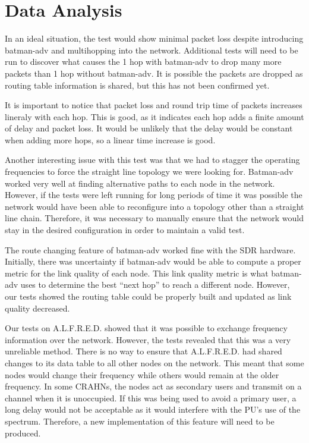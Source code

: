 
\section{Data Analysis}

In an ideal situation, the test would show minimal packet loss despite introducing batman-adv and multihopping into the network. Additional tests will need to be run to discover what causes the 1 hop with batman-adv to drop many more packets than 1 hop without batman-adv. It is possible the packets are dropped as routing table information is shared, but this has not been confirmed yet. 

It is important to notice that packet loss and round trip time of packets increases lineraly with each hop. This is good, as it indicates each hop adds a finite amount of delay and packet loss. It would be unlikely that the delay would be constant when adding more hops, so a linear time increase is good. 

Another interesting issue with this test was that we had to stagger the operating frequencies to force the straight line topology we were looking for. Batman-adv worked very well at finding alternative paths to each node in the network. However, if the tests were left running for long periods of time it was possible the network would have been able to reconfigure into a topology other than a straight line chain. Therefore, it was necessary to manually ensure that the network would stay in the desired configuration in order to maintain a valid test. 

The route changing feature of batman-adv worked fine with the SDR hardware. Initially, there was uncertainty if batman-adv would be able to compute a proper metric for the link quality of each node. This link quality metric is what batman-adv uses to determine the best ``next hop'' to reach a different node. However, our tests showed the routing table could be properly built and updated as link quality decreased.

Our tests on A.L.F.R.E.D. showed that it was possible to exchange frequency information over the network. However, the tests revealed that this was a very unreliable method. There is no way to ensure that A.L.F.R.E.D. had shared changes to its data table to all other nodes on the network. This meant that some nodes would change their frequency while others would remain at the older frequency. In some CRAHNs, the nodes act as secondary users and transmit on a channel when it is unoccupied. If this was being used to avoid a primary user, a long delay would not be acceptable as it would interfere with the PU's use of the spectrum. Therefore, a new implementation of this feature will need to be produced. 



